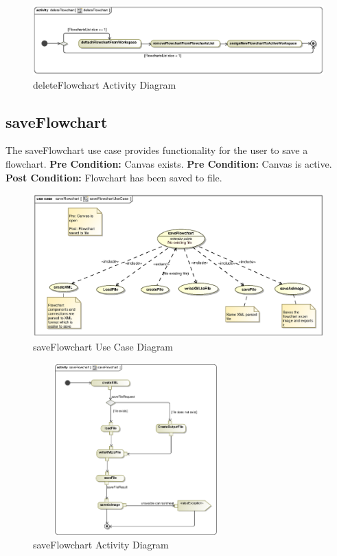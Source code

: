 \documentclass[12pt,a4paper,titlepage]{article}
\begin{document}
\begin{figure}[H]
  \centering
\includegraphics[width=500px]{deleteFlowchartActivity.eps}
\caption{deleteFlowchart Activity Diagram}
\end{figure}

\newpage
\subsection{saveFlowchart}
The saveFlowchart use case provides functionality for the user to save a flowchart.\newline\newline
\textbf{Pre Condition:} Canvas exists.\newline
\textbf{Pre Condition:} Canvas is active.\newline\newline
\textbf{Post Condition:} Flowchart has been saved to file.

\begin{figure}[H]
  \centering
\includegraphics[width=500px]{saveFlowchartUseCase.eps}
\caption{saveFlowchart Use Case Diagram}
\end{figure}

\begin{figure}[H]
  \centering
\includegraphics[height=250px, width=300px]{saveFlowchart.eps}
\caption{saveFlowchart Activity Diagram}
\end{figure}
\end{document}
